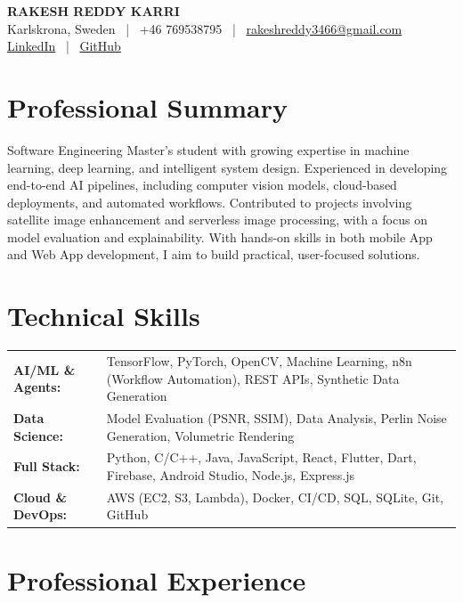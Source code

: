 \documentclass[11pt, a4paper]{article}
\begin{document}
\begin{center}
    {\LARGE\bfseries\color{primaryBlue} RAKESH REDDY KARRI} \\
    \vspace{0.5em}
    \small Karlskrona, Sweden \ | \ +46 769538795 \ | \ \href{mailto:rakeshreddy3466@gmail.com}{rakeshreddy3466@gmail.com} \\
    \href{https://www.linkedin.com/in/rakesh-reddy-553033256/}{LinkedIn} \ | \ \href{https://github.com/rakeshreddy3466}{GitHub}
\end{center}

\section*{Professional Summary}
Software Engineering Master’s student with growing expertise in machine learning, deep learning, and intelligent system design. Experienced in developing end-to-end AI pipelines, including computer vision models, cloud-based deployments, and automated workflows. Contributed to projects involving satellite image enhancement and serverless image processing, with a focus on model evaluation and explainability. With hands-on skills in both mobile App and Web App development, I aim to build practical, user-focused solutions.

\section*{Technical Skills}
\noindent
\begin{tabularx}{\textwidth}{@{}l X@{}}
\textbf{AI/ML \& Agents:} & TensorFlow, PyTorch, OpenCV, Machine Learning, n8n (Workflow Automation), REST APIs, Synthetic Data Generation \\
\textbf{Data Science:} & Model Evaluation (PSNR, SSIM), Data Analysis, Perlin Noise Generation, Volumetric Rendering \\
\textbf{Full Stack:} & Python, C/C++, Java, JavaScript, React, Flutter, Dart, Firebase, Android Studio, Node.js, Express.js \\
\textbf{Cloud \& DevOps:} & AWS (EC2, S3, Lambda), Docker, CI/CD, SQL, SQLite, Git, GitHub \\
\end{tabularx}

\section*{Professional Experience}
\end{document}
